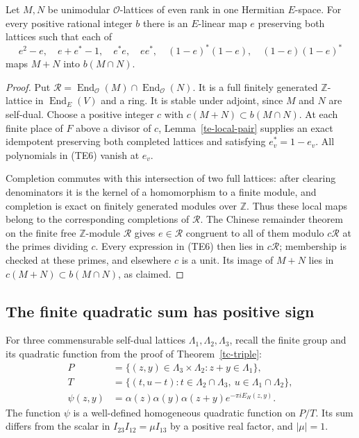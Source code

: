 \begin{proposition}\label{te-projector}
Let $M,N$ be unimodular $\mathcal O$-lattices of even
rank in one Hermitian $E$-space.  For every positive
rational integer $b$ there is an $E$-linear map $e$
preserving both lattices such that each of
\[
 e^2-e,\quad e+e^*-1,\quad e^*e,\quad ee^*,\quad
                 (1-e)^*(1-e),\quad(1-e)(1-e)^*
 \tag{TE6}
\]
maps $M+N$ into $b(M\cap N)$.
\end{proposition}
\begin{proof}
Put $\mathscr R=\operatorname{End}_{\mathcal O}(M)
\cap\operatorname{End}_{\mathcal O}(N)$.  It is a full
finitely generated $\mathbb Z$-lattice in
$\operatorname{End}_E(V)$ and a ring.  It is stable under
adjoint, since $M$ and $N$ are self-dual.
Choose a positive integer $c$ with
$c(M+N)\subset b(M\cap N)$.
At each finite place of $F$ above a divisor of $c$,
Lemma~\ref{te-local-pair} supplies an exact idempotent
preserving both completed lattices and satisfying
$e_v^*=1-e_v$.  All polynomials in (TE6) vanish at $e_v$.

Completion commutes with this intersection of two full
lattices: after clearing denominators it is the kernel
of a homomorphism to a finite module, and completion is
exact on finitely generated modules over $\mathbb Z$.
Thus these local maps belong to the corresponding
completions of $\mathscr R$.
The Chinese remainder theorem on the finite free
$\mathbb Z$-module $\mathscr R$ gives
$e\in\mathscr R$ congruent to all of them modulo
$c\mathscr R$ at the primes dividing $c$.
Every expression in (TE6) then lies in $c\mathscr R$;
membership is checked at these primes, and elsewhere
$c$ is a unit.  Its image of $M+N$ lies in
$c(M+N)\subset b(M\cap N)$, as claimed.
\end{proof}

\subsection{The finite quadratic sum has positive sign}

For three commensurable self-dual lattices
$\Lambda_1,\Lambda_2,\Lambda_3$, recall the finite group
and its quadratic function from the proof of
Theorem~\ref{tc-triple}:
\[
 \begin{split}
 P&=\{(z,y)\in\Lambda_3\times\Lambda_2:z+y\in\Lambda_1\},\\
 T&=\{(t,u-t):t\in\Lambda_2\cap\Lambda_3,
                              \ u\in\Lambda_1\cap\Lambda_2\},\\
 \psi(z,y)&=\alpha(z)\alpha(y)\alpha(z+y)e^{-\pi iE_H(z,y)}.
 \end{split}
 \tag{TE7}
\]
The function $\psi$ is a well-defined homogeneous quadratic
function on $P/T$.  Its sum differs from the scalar
in $I_{23}I_{12}=\mu I_{13}$ by a positive real factor,
and $|\mu|=1$.

